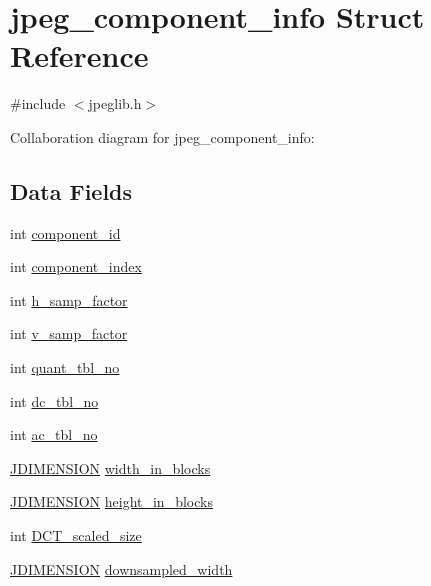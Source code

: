\hypertarget{structjpeg__component__info}{}\section{jpeg\+\_\+component\+\_\+info Struct Reference}
\label{structjpeg__component__info}


{\ttfamily \#include $<$jpeglib.\+h$>$}



Collaboration diagram for jpeg\+\_\+component\+\_\+info\+:
\subsection*{Data Fields}
\begin{DoxyCompactItemize}
\item 
int \hyperlink{structjpeg__component__info_a205782ff7ec47c58cb470f121247ea8d}{component\+\_\+id}
\item 
int \hyperlink{structjpeg__component__info_aa29b9e1c664a9b0b8a1c3069ad167817}{component\+\_\+index}
\item 
int \hyperlink{structjpeg__component__info_a3a8e122fa2eee3c7bede586d371fe202}{h\+\_\+samp\+\_\+factor}
\item 
int \hyperlink{structjpeg__component__info_a83b263da2a749a8fe96be728889af0df}{v\+\_\+samp\+\_\+factor}
\item 
int \hyperlink{structjpeg__component__info_a0a9d70b6a95d3ca58a34a7ea8bfefbf8}{quant\+\_\+tbl\+\_\+no}
\item 
int \hyperlink{structjpeg__component__info_a304fa583caa0601abc7077a218988854}{dc\+\_\+tbl\+\_\+no}
\item 
int \hyperlink{structjpeg__component__info_adfea67573a39b232c3d82ac808539a83}{ac\+\_\+tbl\+\_\+no}
\item 
\hyperlink{jmorecfg_8h_a04ed4674f6f1d0d50ec241531e38274f}{J\+D\+I\+M\+E\+N\+S\+I\+ON} \hyperlink{structjpeg__component__info_a059454e8192effeabc6eab34e2ad198d}{width\+\_\+in\+\_\+blocks}
\item 
\hyperlink{jmorecfg_8h_a04ed4674f6f1d0d50ec241531e38274f}{J\+D\+I\+M\+E\+N\+S\+I\+ON} \hyperlink{structjpeg__component__info_a3f9218e7590c328bfd88d900f58886f4}{height\+\_\+in\+\_\+blocks}
\item 
int \hyperlink{structjpeg__component__info_a432693cedd42cb8d255564d5c02e8573}{D\+C\+T\+\_\+scaled\+\_\+size}
\item 
\hyperlink{jmorecfg_8h_a04ed4674f6f1d0d50ec241531e38274f}{J\+D\+I\+M\+E\+N\+S\+I\+ON} \hyperlink{structjpeg__component__info_aacbe6c10eca470c8ec331f91be8cccee}{downsampled\+\_\+width}

\end{DoxyCompactItemize}
